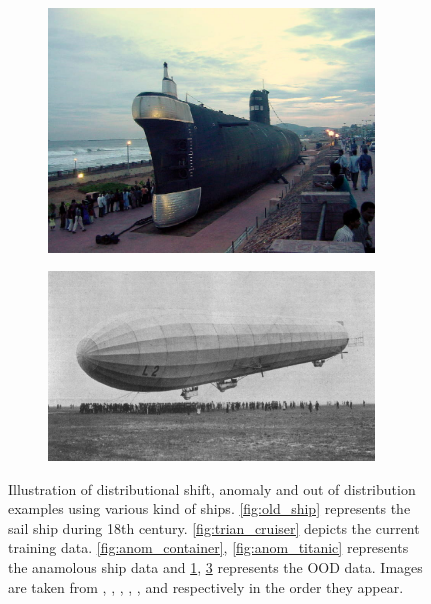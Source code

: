 \begin{figure}[h!]
\begin{subfigure}{0.333\textwidth}
        \includegraphics[height=0.15\textheight,width=0.95\textwidth]{images/intro_ood_anomaly/ood_submarine.jpg}
        \caption{}
        \label{fig:ood_submarine}
    \end{subfigure}
    \begin{subfigure}{0.333\textwidth}
        \centering
        \includegraphics[height=0.15\textheight,width=0.95\textwidth]{images/intro_ood_anomaly/ood_airship.jpg}
        \caption{}
        \label{fig:ood_airship}
    \end{subfigure}
    \caption{Illustration of distributional shift, anomaly and out of distribution examples using various kind of ships. \ref{fig:old_ship} represents the sail ship during 18th century. \ref{fig:trian_cruiser} depicts the current training data.
    \ref{fig:anom_container}, \ref{fig:anom_titanic} represents the anamolous ship data and \ref{fig:ood_submarine}, \ref{fig:ood_airship} represents the OOD data. Images are taken from \cite{old_ship}, \cite{train_cruiser}, \cite{container},
    \cite{titanic}, \cite{submarine}, and \cite{airship} respectively in the order they appear.}
\end{figure}

